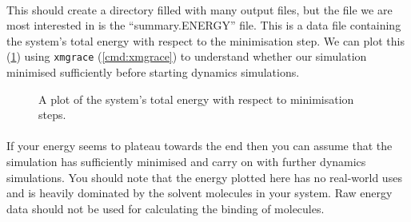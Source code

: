     \paragraph{}
        This should create a directory filled with many output files, but the file we are most interested in is the \enquote{summary.ENERGY} file. This is a data file containing the system's total energy with respect to the minimisation step. We can plot this (\cref{fig:minEnergy}) using \texttt{xmgrace} (\cref{cmd:xmgrace}) to understand whether our simulation minimised sufficiently before starting dynamics simulations.

    \begin{figure}
        \centering
        \caption{A plot of the system's total energy with respect to minimisation steps.}
        \label{fig:minEnergy}
    \end{figure}

    \paragraph{}
        If your energy seems to plateau towards the end then you can assume that the simulation has sufficiently minimised and carry on with further dynamics simulations. You should note that the energy plotted here has no real-world uses and is heavily dominated by the solvent molecules in your system. Raw energy data should not be used for calculating the binding of molecules.

